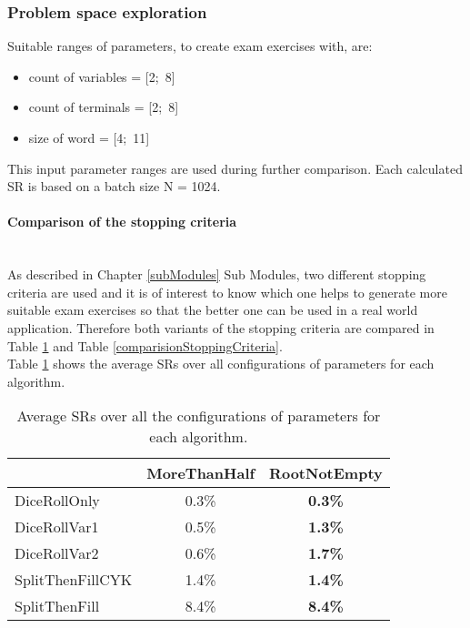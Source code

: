 \subsubsection{Problem space exploration}
Suitable ranges of parameters, to create exam exercises with, are:
\begin{itemize}[noitemsep,nolistsep]
	\item count of variables = [2;~8]
	\item count of terminals = [2;~8]
	\item size of word = [4;~11]
\end{itemize}
This input parameter ranges are used during further comparison. Each calculated SR is based on a batch size N = 1024.
\clearpage
\paragraph{Comparison of the stopping criteria}~\\
As described in Chapter \ref{subModules} Sub Modules, two different stopping criteria  are used and it is of interest to know which one helps to generate more suitable exam exercises so that the better one can be used in a real world application. Therefore both variants of the stopping criteria are compared in Table \ref{comparisionMeanValue} and Table \ref{comparisionStoppingCriteria}.\\
Table \ref{comparisionMeanValue} shows the average SRs over all configurations of parameters for each algorithm.

\begin{table}[h]
	\centering
	\begin{tabular}{l|c|c|}
		\cline{2-3}
		& MoreThanHalf & RootNotEmpty \\ \hline
		\multicolumn{1}{|l|}{DiceRollOnly}  & 0.3\%             & \textbf{0.3\%}            \\ \hline
		\multicolumn{1}{|l|}{DiceRollVar1}  & 0.5\%             & \textbf{1.3\%}            \\ \hline
		\multicolumn{1}{|l|}{DiceRollVar2}  & 0.6\%             & \textbf{1.7\%}            \\ \hline
		\multicolumn{1}{|l|}{SplitThenFillCYK} & 1.4\%             & \textbf{1.4\%}            \\ \hline
		\multicolumn{1}{|l|}{SplitThenFill}  & 8.4\%             & \textbf{8.4\%}             \\ \hline
	\end{tabular}
	\caption{Average SRs over all the configurations of parameters for each algorithm.}
	\label{comparisionMeanValue}
\end{table}

